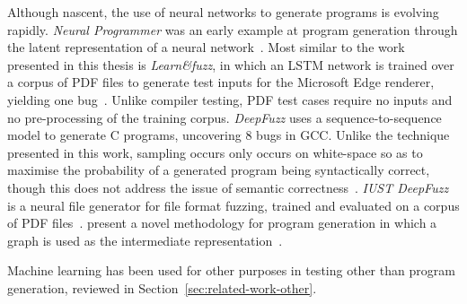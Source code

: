 Although nascent, the use of neural networks to generate programs is evolving rapidly. \emph{Neural Programmer} was an early example at program generation through the latent representation of a neural network~\cite{Neelakantan2016}.
Most similar to the work presented in this thesis is \emph{Learn\&fuzz}, in which an LSTM network is trained over a corpus of PDF files to generate test inputs for the Microsoft Edge renderer, yielding one bug~\cite{Godefroid2017}. Unlike compiler testing, PDF test cases require no inputs and no pre-processing of the training corpus.
\emph{DeepFuzz} uses a sequence-to-sequence model to generate C programs, uncovering 8 bugs in GCC. Unlike the technique presented in this work, sampling occurs only occurs on white-space so as to maximise the probability of a generated program being syntactically correct, though this does not address the issue of semantic correctness~\cite{Liu2019}.
\emph{IUST DeepFuzz} is a neural file generator for file format fuzzing, trained and evaluated on a corpus of PDF files~\cite{Nasrabadi2018}.
\citeauthor{Brockschmidt2018} present a novel methodology for program generation in which a graph is used as the intermediate representation~\cite{Brockschmidt2018}.

Machine learning has been used for other purposes in testing other than program generation, reviewed in Section~\ref{sec:related-work-other}.
